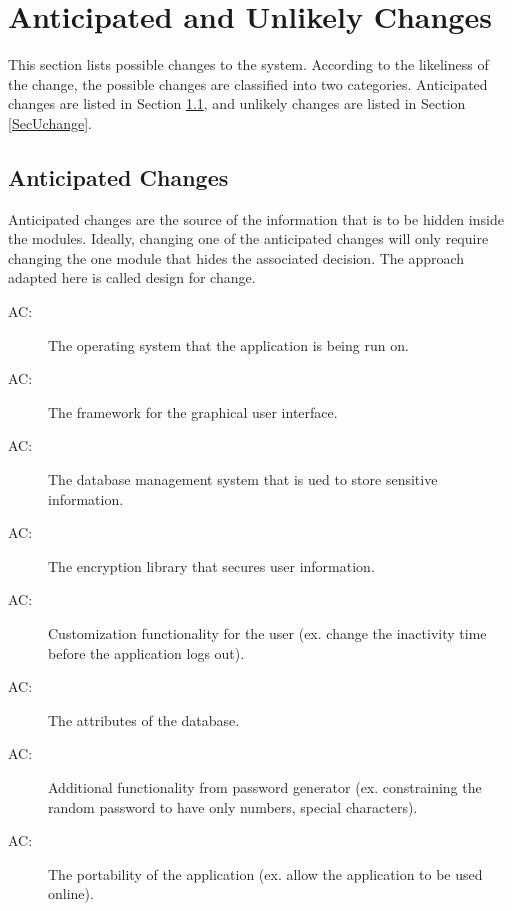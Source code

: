\documentclass[12pt, titlepage]{article}
\newcounter{acnum}
\newcommand{\actheacnum}{AC\theacnum}
\begin{document}
\section{Anticipated and Unlikely Changes} \label{SecChange}

This section lists possible changes to the system. According to the likeliness
of the change, the possible changes are classified into two
categories. Anticipated changes are listed in Section \ref{SecAchange}, and
unlikely changes are listed in Section \ref{SecUchange}.

\subsection{Anticipated Changes} \label{SecAchange}

Anticipated changes are the source of the information that is to be hidden
inside the modules. Ideally, changing one of the anticipated changes will only
require changing the one module that hides the associated decision. The approach
adapted here is called design for change.

\begin{description}
  \item[ \actheacnum \label{acInput}:] The operating system
  that the application is being run on.
  \item[ \actheacnum \label{acFramework}:] The framework for
  the graphical user interface.
  \item[ \actheacnum \label{acDatabase}:] The database management system that is ued to store sensitive information.
  \item[ \actheacnum \label{acEncryption}:] The encryption library that secures user information.
  \item[ \actheacnum \label{acUserCustom}:] Customization functionality for the user (ex. change the inactivity time before the application logs out).
  \item[ \actheacnum \label{acDBAttributes}:] The attributes of the database.
  \item[ \actheacnum \label{acPassGenFunc}:] Additional functionality from password generator (ex. constraining the random password to have only numbers, special characters).
  \item[ \actheacnum \label{acPortability}:] The portability of the application (ex. allow the application to be used online).
\end{description}
\end{document}
